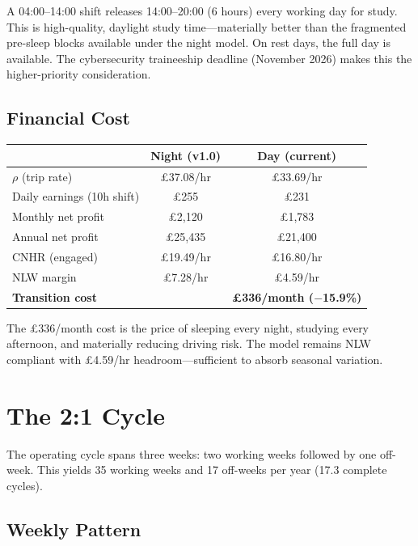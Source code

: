 \documentclass[a4paper,11pt]{article}
\begin{document}
A 04:00--14:00 shift releases 14:00--20:00 (6 hours) every working day for study. This is high-quality, daylight study time---materially better than the fragmented pre-sleep blocks available under the night model. On rest days, the full day is available. The cybersecurity traineeship deadline (November 2026) makes this the higher-priority consideration.

\subsection{Financial Cost}

\begin{tabularx}{\textwidth}{X C C}
\toprule
& \textbf{Night (v1.0)} & \textbf{Day (current)} \\
\midrule
$\rho$ (trip rate) & \pounds37.08/hr & \pounds33.69/hr \\
Daily earnings (10h shift) & \pounds255 & \pounds231 \\
Monthly net profit & \pounds2,120 & \pounds1,783 \\
Annual net profit & \pounds25,435 & \pounds21,400 \\
CNHR (engaged) & \pounds19.49/hr & \pounds16.80/hr \\
NLW margin & \pounds7.28/hr & \pounds4.59/hr \\
 \textbf{Transition cost} & & \textbf{\pounds336/month ($-$15.9\%)} \\
\bottomrule
\end{tabularx}

\medskip
The \pounds336/month cost is the price of sleeping every night, studying every afternoon, and materially reducing driving risk. The model remains NLW compliant with \pounds4.59/hr headroom---sufficient to absorb seasonal variation.

\newpage

\section{The 2:1 Cycle}

The operating cycle spans three weeks: two working weeks followed by one off-week. This yields 35 working weeks and 17 off-weeks per year (17.3 complete cycles).

\subsection{Weekly Pattern}
\end{document}
